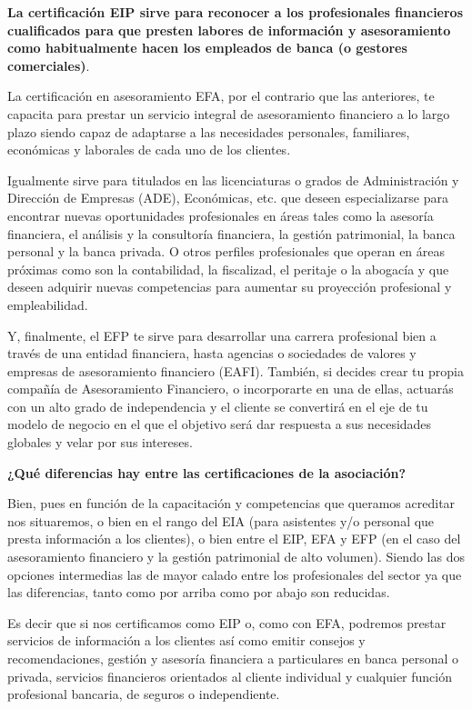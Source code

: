 \documentclass[
  letterpaper,
  DIV=11,
  numbers=noendperiod]{scrreprt}
\begin{document}
\textbf{La certificación EIP sirve para reconocer a los profesionales
financieros cualificados para que presten labores de información y
asesoramiento como habitualmente hacen los empleados de banca (o
gestores comerciales)}.

La certificación en asesoramiento EFA, por el contrario que las
anteriores, te capacita para prestar un servicio integral de
asesoramiento financiero a lo largo plazo siendo capaz de adaptarse a
las necesidades personales, familiares, económicas y laborales de cada
uno de los clientes.

Igualmente sirve para titulados en las licenciaturas o grados de
Administración y Dirección de Empresas (ADE), Económicas, etc. que
deseen especializarse para encontrar nuevas oportunidades profesionales
en áreas tales como la asesoría financiera, el análisis y la consultoría
financiera, la gestión patrimonial, la banca personal y la banca
privada. O otros perfiles profesionales que operan en áreas próximas
como son la contabilidad, la fiscalizad, el peritaje o la abogacía y que
deseen adquirir nuevas competencias para aumentar su proyección
profesional y empleabilidad.

Y, finalmente, el EFP te sirve para desarrollar una carrera profesional
bien a través de una entidad financiera, hasta agencias o sociedades de
valores y empresas de asesoramiento financiero (EAFI). También, si
decides crear tu propia compañía de Asesoramiento Financiero, o
incorporarte en una de ellas, actuarás con un alto grado de
independencia y el cliente se convertirá en el eje de tu modelo de
negocio en el que el objetivo será dar respuesta a sus necesidades
globales y velar por sus intereses.

\textbf{¿Qué diferencias hay entre las certificaciones de la
asociación?}

Bien, pues en función de la capacitación y competencias que queramos
acreditar nos situaremos, o bien en el rango del EIA (para asistentes
y/o personal que presta información a los clientes), o bien entre el
EIP, EFA y EFP (en el caso del asesoramiento financiero y la gestión
patrimonial de alto volumen). Siendo las dos opciones intermedias las de
mayor calado entre los profesionales del sector ya que las diferencias,
tanto como por arriba como por abajo son reducidas.

Es decir que si nos certificamos como EIP o, como con EFA, podremos
prestar servicios de información a los clientes así como emitir consejos
y recomendaciones, gestión y asesoría financiera a particulares en banca
personal o privada, servicios financieros orientados al cliente
individual y cualquier función profesional bancaria, de seguros o
independiente.
\end{document}
